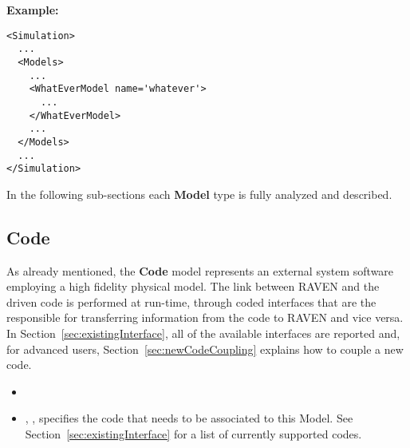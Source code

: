 \textbf{Example:}
\begin{lstlisting}[style=XML]
<Simulation>
  ...
  <Models>
    ...
    <WhatEverModel name='whatever'>
      ...
    </WhatEverModel>
    ...
  </Models>
  ...
</Simulation>
\end{lstlisting}
In the following sub-sections each \textbf{Model} type is fully analyzed and
described.
%
\subsection{Code}
\label{subsec:models_code}
As already mentioned, the \textbf{Code} model represents an external system
software employing a high fidelity physical model.
%
The link between RAVEN and the driven code is performed at run-time, through
coded interfaces that are the responsible for transferring information from the
code to RAVEN and vice versa.
%
In Section~\ref{sec:existingInterface}, all of the available interfaces are
reported and, for advanced users, Section~\ref{sec:newCodeCoupling} explains how
to couple a new code.


%
\attrsIntro
%
\vspace{-5mm}
\begin{itemize}
  \itemsep0em
  \item \nameDescription
  \item {}, , specifies the
  code that needs to be associated to this Model.
  \nb See Section~\ref{sec:existingInterface} for a list of currently supported
  codes.
\end{itemize}
\vspace{-5mm}

